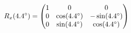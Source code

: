 \documentclass[preview]{standalone}
\begin{document}
\begin{align*}
\special{dvisvgm:raw <g id='unique000'>}R_x(4.4^\circ) = \begin{pmatrix} 1 & 0 & 0 \\ 0 & \cos(4.4^\circ) & -\sin(4.4^\circ) \\ 0 & \sin(4.4^\circ) & \cos(4.4^\circ) \end{pmatrix}\special{dvisvgm:raw </g>}
\end{align*}
\end{document}

